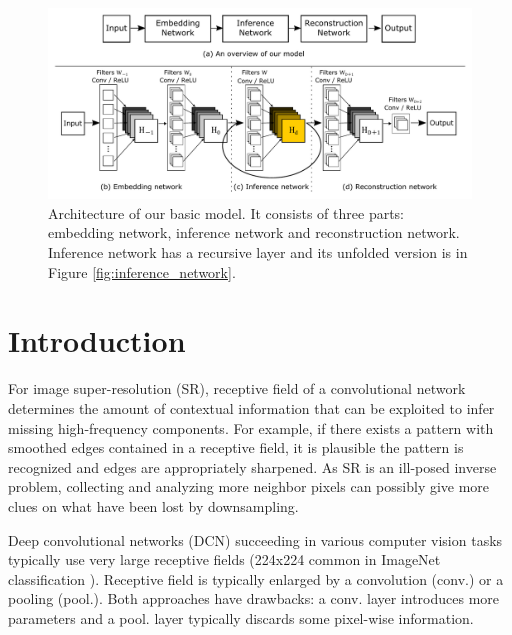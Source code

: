 \documentclass[10pt,twocolumn,letterpaper]{article}
\begin{document}
\begin{figure}[t]
	\includegraphics[width=\textwidth]{figs/f1}
	\caption {Architecture of our basic model. It consists of three parts: embedding network, inference network and reconstruction network. Inference network has a recursive layer and its unfolded version is in Figure \ref{fig:inference_network}.}
	\label{fig:overview}
\end{figure}


\section{Introduction}
For image super-resolution (SR), receptive field of a convolutional network determines the amount of contextual information that can be exploited to infer missing high-frequency components. For example, if there exists a pattern with smoothed edges contained in a receptive field, it is plausible the pattern is recognized and edges are appropriately sharpened. As SR is an ill-posed inverse problem, collecting and analyzing more neighbor pixels can possibly give more clues on what have been lost by downsampling. 

Deep convolutional networks (DCN) succeeding in various computer vision tasks typically use very large receptive fields  (224x224 common in ImageNet classification \cite{krizhevsky2012imagenet, simonyan2015very}). Receptive field is typically enlarged by a convolution (conv.) or a pooling (pool.).  Both approaches have drawbacks: a conv. layer introduces more parameters and a pool. layer typically discards some pixel-wise information. 

\end{document}
